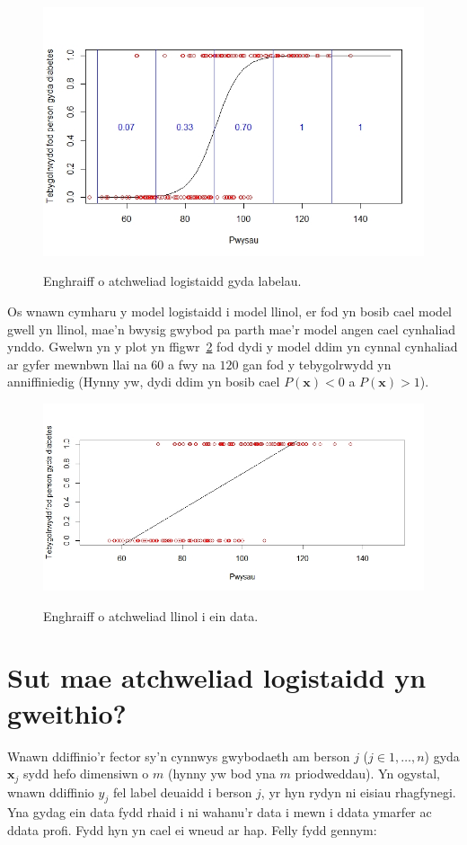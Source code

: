 \begin{figure}[H]
\begin{center}
\includegraphics[width=0.5\linewidth]{../img/atchweliad_logistaidd_gyda_pwyntiau.jpeg}
\label{fig:Enghraifft_o_atchweliad_logistaidd_pwyntiau}
\caption{Enghraiff o atchweliad logistaidd gyda labelau.}
\end{center}
\end{figure}

Os wnawn cymharu y model logistaidd i model llinol, er fod yn bosib cael model gwell yn llinol, mae'n bwysig gwybod pa parth mae'r model angen cael cynhaliad ynddo. Gwelwn yn y plot yn ffigwr~\ref{fig:Enghraifft_o_atchweliad_llinol} fod dydi y model ddim yn cynnal cynhaliad ar gyfer mewnbwn llai na $60$ a fwy na $120$ gan fod y tebygolrwydd yn anniffiniedig (Hynny yw, dydi ddim yn bosib cael $P(\mathbf{x})<0$ a $P(\mathbf{x})>1$). 

\begin{figure}[H]
\begin{center}
\includegraphics[width=0.5\linewidth]{../img/cymharu_llinol.jpeg}
\label{fig:Enghraifft_o_atchweliad_llinol}
\caption{Enghraiff o atchweliad llinol i ein data.}
\end{center}
\end{figure}

\section{Sut mae atchweliad logistaidd yn gweithio?}

Wnawn ddiffinio'r fector sy'n cynnwys gwybodaeth am berson $j$ ($j \in {1,\dots,n}$) gyda $\mathbf{x}_j$ sydd hefo dimensiwn o $m$ (hynny yw bod yna $m$ priodweddau). Yn ogystal, wnawn ddiffinio $y_j$ fel label deuaidd i berson $j$, yr hyn rydyn ni eisiau rhagfynegi. Yna gydag ein data fydd rhaid i ni wahanu'r data i mewn i ddata ymarfer ac ddata profi. Fydd hyn yn cael ei wneud ar hap. Felly fydd gennym:

